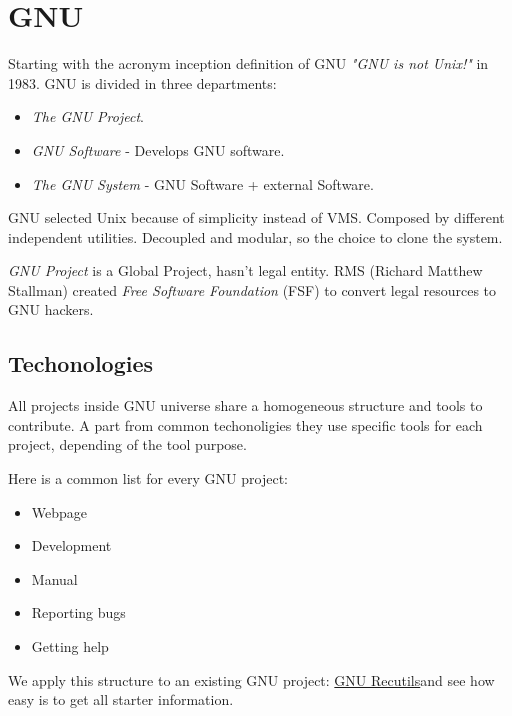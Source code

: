 \section{GNU}
\label{sec:gnu}

Starting with the acronym inception definition of GNU \textit{"GNU is not Unix!"} in 1983. GNU is divided in three departments:
\begin{itemize}
	\item \textit{The GNU Project}.
	\item \textit{GNU Software} - Develops GNU software.
	\item \textit{The GNU System} - GNU Software + external Software.
\end{itemize}

\par GNU selected Unix because of simplicity instead of VMS. Composed by different independent utilities. Decoupled and modular, so the choice to clone the system.

\par \textit{GNU Project} is a Global Project, hasn’t legal entity. RMS (Richard Matthew Stallman) created \textit{Free Software Foundation} (FSF) to convert legal resources to GNU hackers.

\subsection{Techonologies}

\par All projects inside GNU universe share a homogeneous structure and tools to contribute. A part from common techonoligies they use specific tools for each project, depending of the tool purpose.

\par Here is a common list for every GNU project:

\begin{itemize}
	\item Webpage
	\item Development
	\item Manual
	\item Reporting bugs
	\item Getting help
\end{itemize}

\par We apply this structure to an existing GNU project: \href{http://www.gnu.org/software/recutils/}{GNU Recutils}and see how easy is to get all starter information.

